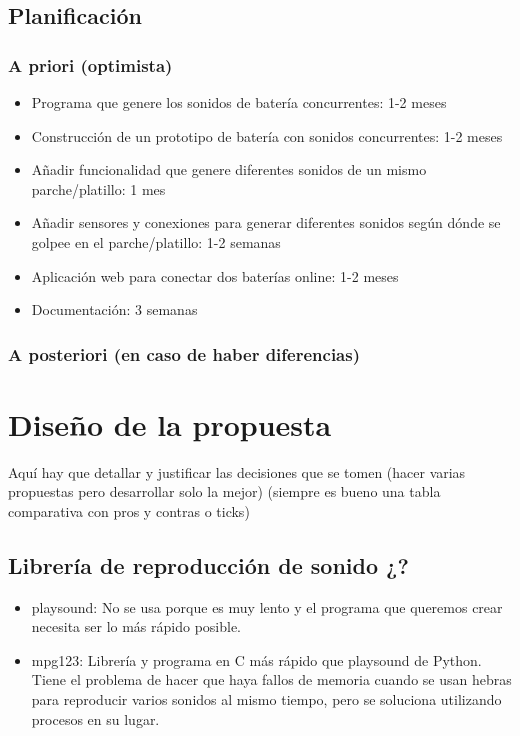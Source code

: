 \documentclass{article}
\begin{document}
\subsection{Planificación}

 \subsubsection{A priori (optimista)}

 \begin{itemize}
    \item
        Programa que genere los sonidos de batería concurrentes: 1-2 meses
    \item
        Construcción de un prototipo de batería con sonidos concurrentes: 1-2 meses
    \item
        Añadir funcionalidad que genere diferentes sonidos de un mismo parche/platillo: 1 mes
    \item
        Añadir sensores y conexiones para generar diferentes sonidos según dónde se golpee en el
        parche/platillo: 1-2 semanas
    \item
        Aplicación web para conectar dos baterías online: 1-2 meses
    \item
        Documentación: 3 semanas
\end{itemize}

 \subsubsection{A posteriori (en caso de haber diferencias)}
\section{Diseño de la propuesta}\label{sec:Diseno}

 Aquí hay que detallar y justificar las decisiones que se tomen (hacer varias propuestas pero desarrollar solo la
 mejor) (siempre es bueno una tabla comparativa con pros y contras o ticks)

 \subsection{Librería de reproducción de sonido ¿?}
 \begin{itemize}
     \item
        playsound\cite{playsound}: No se usa porque es muy lento y el programa que queremos crear necesita ser lo
        más rápido posible.
     \item
        mpg123\cite{mpg123}: Librería y programa en C más rápido que playsound de Python. Tiene el problema de
        hacer que haya fallos de memoria cuando se usan hebras para reproducir varios sonidos al mismo tiempo, pero
        se soluciona utilizando procesos en su lugar.
 \end{itemize}
\end{document}
